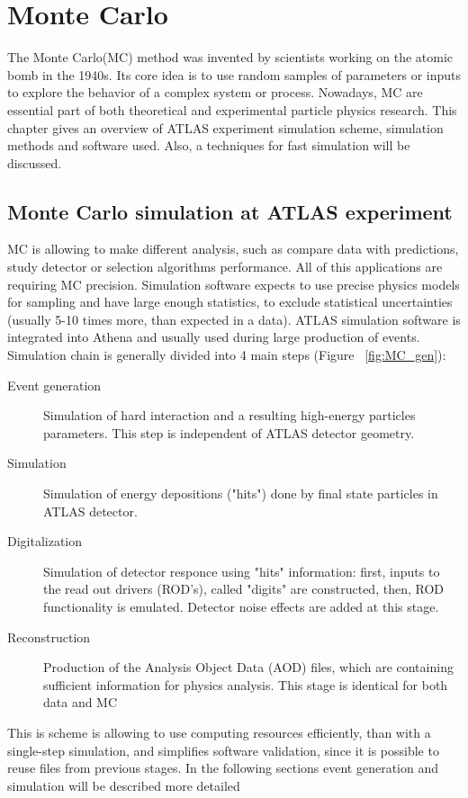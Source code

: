 
\chapter{Monte Carlo}\label{chap:MC}
The Monte Carlo(MC) method was invented by scientists working on the atomic bomb in the 1940s. Its core idea is to use random samples of parameters or inputs to explore the behavior of a complex system or process.  Nowadays, MC are essential part of both theoretical and experimental particle physics research.
This chapter gives an overview of ATLAS experiment simulation scheme, simulation methods and software used. Also, a techniques for fast simulation will be discussed. 

\section{Monte Carlo simulation at ATLAS experiment}

\begin{figure}[h]
\end{figure}

MC is allowing to make different analysis, such as compare data with predictions, study detector or selection algorithms performance. All of this applications are requiring MC precision. Simulation software expects to use precise physics models for sampling and have large enough statistics, to exclude statistical uncertainties (usually 5-10 times more, than expected in a data). ATLAS simulation software is integrated into Athena and usually used during large production of events. Simulation chain is generally divided into 4 main steps (Figure ~\ref{fig:MC_gen}):
\begin{description}
\item[Event generation]Simulation of hard interaction and a resulting high-energy particles parameters. This step is independent of ATLAS detector geometry.
\item[Simulation]Simulation of energy depositions ("hits") done by final state particles in ATLAS detector.
\item[Digitalization] Simulation of detector responce using "hits" information:  first, inputs to the read out drivers (ROD's), called "digits" are constructed, then, ROD functionality is emulated. Detector noise effects are added at this stage. 
\item[Reconstruction] Production of the Analysis Object Data (AOD) files, which are containing sufficient information for physics analysis. This stage is identical for both data and MC
\end{description}
This is scheme is allowing to use computing resources efficiently, than with a single-step simulation, and simplifies software validation, since it is possible to reuse files from previous stages. In the following sections event generation and simulation will be described more detailed

